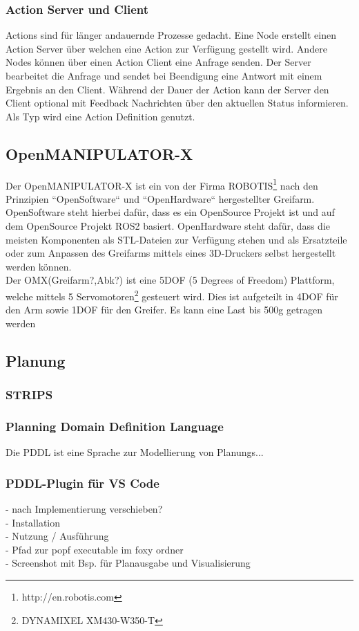 \subsubsection{Action Server und Client}
Actions sind für länger andauernde Prozesse gedacht.
Eine Node erstellt einen Action Server über welchen eine Action zur Verfügung gestellt wird.
Andere Nodes können über einen Action Client eine Anfrage senden.
Der Server bearbeitet die Anfrage und sendet bei Beendigung eine Antwort mit einem Ergebnis an den Client.
Während der Dauer der Action kann der Server den Client optional mit Feedback Nachrichten über den aktuellen Status informieren.\\
Als Typ wird eine Action Definition genutzt. 
\subsection{OpenMANIPULATOR-X}
Der OpenMANIPULATOR-X ist ein von der Firma ROBOTIS{\footnote{http://en.robotis.com}} nach den Prinzipien ``OpenSoftware`` und ``OpenHardware`` hergestellter Greifarm.
OpenSoftware steht hierbei dafür, dass es ein OpenSource Projekt ist und auf dem OpenSource Projekt \ac{ROS2} basiert.
OpenHardware steht dafür, dass die meisten Komponenten als STL-Dateien zur Verfügung stehen und als Ersatzteile oder zum Anpassen des Greifarms mittels eines 3D-Druckers selbst hergestellt werden können.\\
Der OMX(Greifarm?,Abk?) ist eine 5DOF (5 Degrees of Freedom) Plattform, welche mittels 5 Servomotoren{\footnote{DYNAMIXEL XM430-W350-T}} gesteuert wird.
Dies ist aufgeteilt in 4DOF für den Arm sowie 1DOF für den Greifer.
Es kann eine Last bis 500g getragen werden
\subsection {Planung}
\subsubsection{STRIPS}
\subsubsection{Planning Domain Definition Language}
Die \ac{PDDL} ist eine Sprache zur Modellierung von Planungs...
\subsubsection{PDDL-Plugin für VS Code}
- nach Implementierung verschieben?\\
- Installation\\
- Nutzung / Ausführung\\
- Pfad zur popf executable im foxy ordner\\
- Screenshot mit Bsp. für Planausgabe und Visualisierung\\

